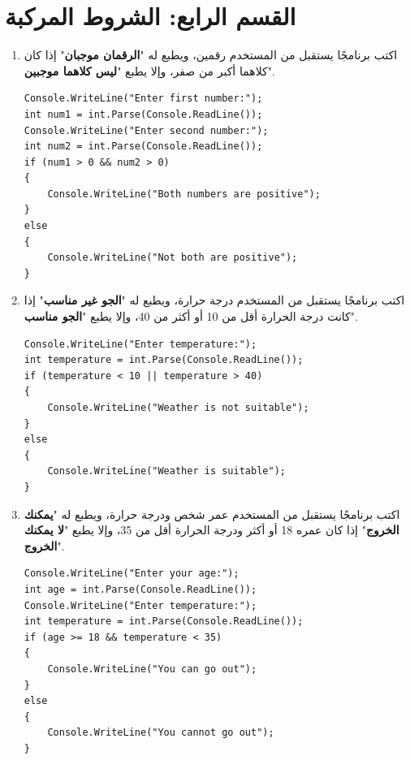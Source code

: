 \documentclass[14pt]{extarticle}
\begin{document}
\clearpage
\section*{القسم الرابع: الشروط المركبة}

\begin{enumerate}[resume, itemsep=2em]

\item
اكتب برنامجًا يستقبل من المستخدم رقمين، ويطبع له "\textbf{الرقمان موجبان}" إذا كان كلاهما أكبر من صفر، وإلا يطبع "\textbf{ليس كلاهما موجبين}".
\ifwithsols
\begin{boxSolution}
\begin{english}
\begin{verbatim}
Console.WriteLine("Enter first number:");
int num1 = int.Parse(Console.ReadLine());
Console.WriteLine("Enter second number:");
int num2 = int.Parse(Console.ReadLine());
if (num1 > 0 && num2 > 0)
{
    Console.WriteLine("Both numbers are positive");
}
else
{
    Console.WriteLine("Not both are positive");
}
\end{verbatim}
\end{english}
\end{boxSolution}
\fi

\filbreak
\item
اكتب برنامجًا يستقبل من المستخدم درجة حرارة، ويطبع له "\textbf{الجو غير مناسب}" إذا كانت درجة الحرارة أقل من 10 أو أكثر من 40، وإلا يطبع "\textbf{الجو مناسب}".
\ifwithsols
\begin{boxSolution}
\begin{english}
\begin{verbatim}
Console.WriteLine("Enter temperature:");
int temperature = int.Parse(Console.ReadLine());
if (temperature < 10 || temperature > 40)
{
    Console.WriteLine("Weather is not suitable");
}
else
{
    Console.WriteLine("Weather is suitable");
}
\end{verbatim}
\end{english}
\end{boxSolution}
\clearpage
\fi

\filbreak
\item
اكتب برنامجًا يستقبل من المستخدم عمر شخص ودرجة حرارة، ويطبع له "\textbf{يمكنك الخروج}" إذا كان عمره 18 أو أكثر ودرجة الحرارة أقل من 35، وإلا يطبع "\textbf{لا يمكنك الخروج}".
\ifwithsols
\begin{boxSolution}
\begin{english}
\begin{verbatim}
Console.WriteLine("Enter your age:");
int age = int.Parse(Console.ReadLine());
Console.WriteLine("Enter temperature:");
int temperature = int.Parse(Console.ReadLine());
if (age >= 18 && temperature < 35)
{
    Console.WriteLine("You can go out");
}
else
{
    Console.WriteLine("You cannot go out");
}
\end{verbatim}
\end{english}
\end{boxSolution}
\fi


\end{enumerate}
\end{document}
